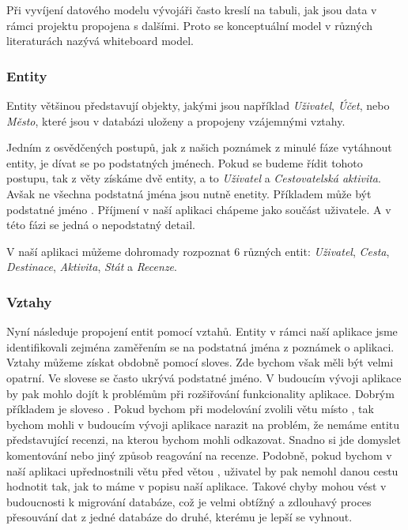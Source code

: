 \documentclass[
  program=infoi,
  biblatex=true,
  sourcecodes=true,
  figures=true,
  glossaries=false,
  index
]{kidiplom}
\begin{document}
Při vyvíjení datového modelu vývojáři často kreslí na tabuli, jak jsou data v rámci projektu propojena s dalšími. Proto se konceptuální model v různých literaturách nazývá whiteboard model. 

\subsubsection{Entity}
Entity většinou představují objekty, jakými jsou například \textit{Uživatel}, \textit{Účet}, nebo \textit{Město}, které jsou v databázi uloženy a propojeny vzájemnými vztahy. 

Jedním z osvědčených postupů, jak z našich poznámek z minulé fáze vytáhnout entity, je dívat se po podstatných jménech. Pokud se budeme řídit tohoto postupu, tak z věty  získáme dvě entity, a to \textit{Uživatel} a \textit{Cestovatelská aktivita}. Avšak ne všechna podstatná jména jsou nutně enetity. Příkladem může být podstatné jméno . Příjmení v naší aplikaci chápeme jako součást uživatele. A v této fázi se jedná o nepodstatný detail.

V naší aplikaci můžeme dohromady rozpoznat 6 různých entit: \textit{Uživatel}, \textit{Cesta}, \textit{Destinace}, \textit{Aktivita}, \textit{Stát} a \textit{Recenze}.

\subsubsection{Vztahy}
Nyní následuje propojení entit pomocí vztahů. Entity v rámci naší aplikace jsme identifikovali  zejména zaměřením se na podstatná jména z poznámek o aplikaci. Vztahy můžeme získat obdobně pomocí sloves. Zde bychom však měli být velmi opatrní. Ve slovese se často ukrývá podstatné jméno. V budoucím vývoji aplikace by pak mohlo dojít k problémům při rozšiřování funkcionality aplikace. Dobrým příkladem je sloveso . Pokud bychom při modelování zvolili větu  místo , tak bychom mohli v budoucím vývoji aplikace narazit na problém, že nemáme entitu představující recenzi, na kterou bychom mohli odkazovat. Snadno si jde domyslet komentování nebo jiný způsob reagování na recenze. Podobně, pokud bychom v naší aplikaci upřednostnili větu  před větou , uživatel by pak nemohl danou cestu hodnotit tak, jak to máme v popisu naší aplikace. Takové chyby mohou vést v budoucnosti k migrování databáze, což je velmi obtížný a zdlouhavý proces přesouvání dat z jedné databáze do druhé, kterému je lepší se vyhnout.
\end{document}
